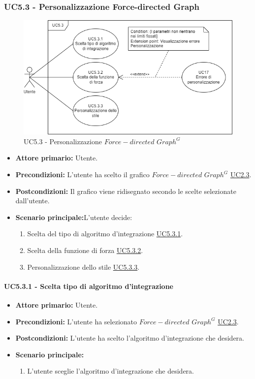 \subsubsection{UC5.3 - Personalizzazione Force-directed Graph}
\label{sec:UC5.3}
\begin{figure}[h!]
	\centering
	\includegraphics[scale=0.60]{../../assets/personalizzazioneForce-directedGraph.png}
	\caption{UC5.3 - Personalizzazione $Force-directed$ $Graph^{G}$}
\end{figure}
\begin{itemize}
    \item \textbf{Attore primario:} Utente.
	\item \textbf{Precondizioni:} L'utente ha scelto il grafico $Force-directed$ $Graph^{G}$ \hyperref[sec:UC2.3]{UC2.3}.
	\item \textbf{Postcondizioni:} Il grafico viene ridisegnato secondo le scelte selezionate dall'utente.
	\item \textbf{Scenario principale:}L'utente decide:
	\begin{enumerate}
        \item Scelta del tipo di algoritmo d'integrazione \hyperref[sec:UC5.3.1]{UC5.3.1}.
        \item Scelta della funzione di forza \hyperref[sec:UC5.3.2]{UC5.3.2}.
        \item Personalizzazione dello stile \hyperref[sec:UC5.3.3]{UC5.3.3}.
    \end{enumerate}
\end{itemize}
\paragraph{UC5.3.1 - Scelta tipo di algoritmo d'integrazione}
\label{sec:UC5.3.1}
    \begin{itemize}
        \item \textbf{Attore primario:} Utente.
        \item \textbf{Precondizioni:} L'utente ha selezionato $Force-directed$ $Graph^{G}$ \hyperref[sec:UC2.3]{UC2.3}.
	    \item \textbf{Postcondizioni:} L'utente ha scelto l'algoritmo d'integrazione che desidera.
	    \item \textbf{Scenario principale:}
	    \begin{enumerate}
	    		\item L'utente sceglie l'algoritmo d'integrazione che desidera.
		\end{enumerate}
    \end{itemize}
